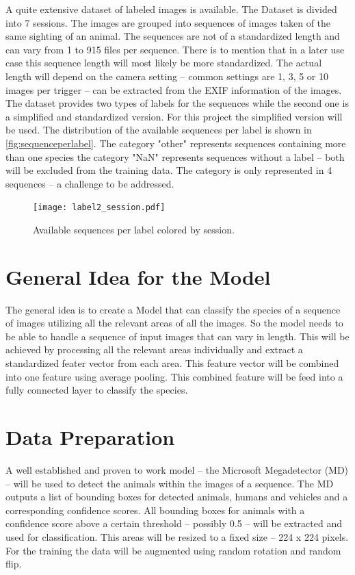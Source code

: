 \documentclass{article}
\begin{document}
A quite extensive dataset of labeled images is available. The Dataset is divided into 7 sessions. The images are grouped into sequences
of images taken of the same sighting of an animal. The sequences are not of a standardized length and can vary from 1 to 915 files per sequence.
There is to mention that in a later use case this sequence length will most likely be more standardized.
The actual length will depend on the camera setting -- common settings are 1, 3, 5 or 10 images per trigger -- 
can be extracted from the EXIF information of the images. The dataset provides two types of labels for the sequences while the second one is
a simplified and standardized version. For this project the simplified version will be used.
The distribution of the available sequences per label is shown in \autoref{fig:sequenceperlabel}.
The category "other" represents sequences containing more than one species the category "NaN" represents sequences without a label -- both 
will be excluded from the training data. The category is only represented in 4 sequences -- a challenge to be addressed.


\begin{figure}[h]
  \centering
  \texttt{[image: label2\_session.pdf]}
  \caption{Available sequences per label colored by session.}
  \label{fig:sequenceperlabel}
\end{figure}

\section*{General Idea for the Model}

The general idea is to create a Model that can classify the species of a sequence of images utilizing all the relevant areas of all the images.
So the model needs to be able to handle a sequence of input images that can vary in length. This will be achieved by processing all the relevant
areas individually and extract a standardized feater vector from each area. This feature vector will be combined into one feature using average pooling.
This combined feature will be feed into a fully connected layer to classify the species.

\section*{Data Preparation}

A well established and proven to work model -- the Microsoft Megadetector (MD) -- will be used to detect the animals within the images of a sequence. 
The MD outputs a list of bounding boxes for detected animals, humans and vehicles and a corresponding confidence scores. 
All bounding boxes for animals with a confidence score above a certain threshold -- possibly 0.5 -- will be extracted and used for classification.
This areas will be resized to a fixed size -- 224 x 224 pixels. For the training the data will be augmented using random rotation and random flip.
\end{document}
